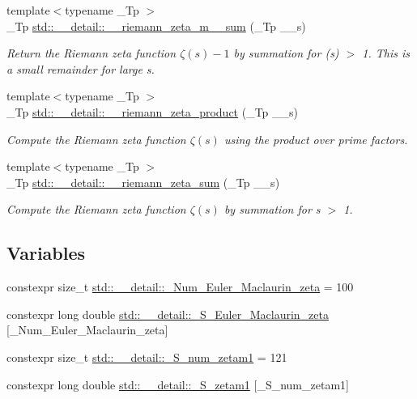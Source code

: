\begin{DoxyCompactItemize}
{\footnotesize template$<$typename \+\_\+\+Tp $>$ }\\\+\_\+\+Tp \hyperlink{namespacestd_1_1____detail_a3985751e758b45d726ea8dec0450ca1e}{std\+::\+\_\+\+\_\+detail\+::\+\_\+\+\_\+riemann\+\_\+zeta\+\_\+m\+\_\+\_\+sum} (\+\_\+\+Tp \+\_\+\+\_\+s)
\begin{DoxyCompactList}\small\item\em Return the Riemann zeta function $ \zeta(s) - 1 $ by summation for (s) $>$ 1. This is a small remainder for large s. \end{DoxyCompactList}\item 
{\footnotesize template$<$typename \+\_\+\+Tp $>$ }\\\+\_\+\+Tp \hyperlink{namespacestd_1_1____detail_a917935f42a21af90b78a19ea81349129}{std\+::\+\_\+\+\_\+detail\+::\+\_\+\+\_\+riemann\+\_\+zeta\+\_\+product} (\+\_\+\+Tp \+\_\+\+\_\+s)
\begin{DoxyCompactList}\small\item\em Compute the Riemann zeta function $ \zeta(s) $ using the product over prime factors. \end{DoxyCompactList}\item 
{\footnotesize template$<$typename \+\_\+\+Tp $>$ }\\\+\_\+\+Tp \hyperlink{namespacestd_1_1____detail_a417dc216465f02bb7ef055fa0e4e1f0b}{std\+::\+\_\+\+\_\+detail\+::\+\_\+\+\_\+riemann\+\_\+zeta\+\_\+sum} (\+\_\+\+Tp \+\_\+\+\_\+s)
\begin{DoxyCompactList}\small\item\em Compute the Riemann zeta function $ \zeta(s) $ by summation for s $>$ 1. \end{DoxyCompactList}\end{DoxyCompactItemize}
\subsection*{Variables}
\begin{DoxyCompactItemize}
\item 
constexpr size\+\_\+t \hyperlink{namespacestd_1_1____detail_ab27e687e1052be7a72de187e0dead124}{std\+::\+\_\+\+\_\+detail\+::\+\_\+\+Num\+\_\+\+Euler\+\_\+\+Maclaurin\+\_\+zeta} = 100
\item 
constexpr long double \hyperlink{namespacestd_1_1____detail_acd941b49595dd03e93c88107ad2f68c2}{std\+::\+\_\+\+\_\+detail\+::\+\_\+\+S\+\_\+\+Euler\+\_\+\+Maclaurin\+\_\+zeta} \mbox{[}\+\_\+\+Num\+\_\+\+Euler\+\_\+\+Maclaurin\+\_\+zeta\mbox{]}
\item 
constexpr size\+\_\+t \hyperlink{namespacestd_1_1____detail_a807e36c2aec3a9f27fdb21726cd464e2}{std\+::\+\_\+\+\_\+detail\+::\+\_\+\+S\+\_\+num\+\_\+zetam1} = 121
\item 
constexpr long double \hyperlink{namespacestd_1_1____detail_a22ed80d9e5c3bc79e61a3cdb8e79a462}{std\+::\+\_\+\+\_\+detail\+::\+\_\+\+S\+\_\+zetam1} \mbox{[}\+\_\+\+S\+\_\+num\+\_\+zetam1\mbox{]}
\end{DoxyCompactItemize}


